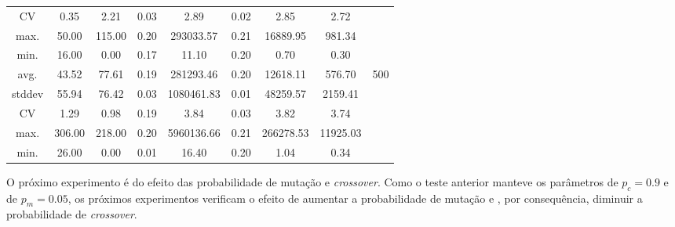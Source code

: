 \documentclass[a4paper]{paper}
\begin{document}
\begin{table}[h!]
\begin{tabular}{| c | c | c | c | c | c | c | c | c |}
    CV & 0.35 & 2.21 & 0.03 & 2.89 & 0.02 & 2.85 & 2.72 & \\ \cline{1-8}
    max. & 50.00 & 115.00 & 0.20 & 293033.57 & 0.21 & 16889.95 & 981.34 & \\ \cline{1-8}
    min. & 16.00 & 0.00 & 0.17 & 11.10 & 0.20 & 0.70 & 0.30 & \\ \hline \hline
    avg. & 43.52 & 77.61 & 0.19 & 281293.46 & 0.20 & 12618.11 & 576.70 & \multirow{5}{1.5cm}{500} \\ \cline{1-8}
    stddev & 55.94 & 76.42 & 0.03 & 1080461.83 & 0.01 & 48259.57 & 2159.41 & \\ \cline{1-8}
    CV & 1.29 & 0.98 & 0.19 & 3.84 & 0.03 & 3.82 & 3.74 & \\ \cline{1-8}
    max. & 306.00 & 218.00 & 0.20 & 5960136.66 & 0.21 & 266278.53 & 11925.03 & \\ \cline{1-8}
    min. & 26.00 & 0.00 & 0.01 & 16.40 & 0.20 & 1.04 & 0.34 & \\ \hline
  \end{tabular}
\end{table}

O próximo experimento é do efeito das probabilidade de mutação e
\textit{crossover}.  Como o teste anterior manteve os parâmetros de $p_c=0.9$ e
de $p_m=0.05$, os próximos experimentos verificam o efeito de aumentar a
probabilidade de mutação e , por consequência, diminuir a probabilidade de
\textit{crossover}.
\end{document}
